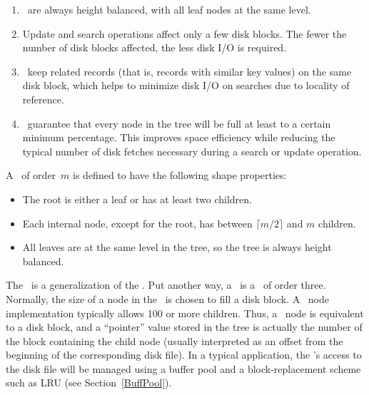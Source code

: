 \begin{enumerate}

\item
\Btrees\ are always height balanced, with all leaf nodes at the same
level.

\item Update and search operations affect only a few disk blocks.
The fewer the number of disk blocks affected, the less disk I/O is
required.

\item
\Btrees\ keep related records (that is, records with similar key
values) on the same disk block, which helps to minimize disk I/O on
searches due to locality of reference.

\item
\Btrees\ guarantee that every node in the tree will be
full at least to a certain minimum percentage.
This improves space efficiency while reducing the typical number of
disk fetches necessary during a search or update operation.

\end{enumerate}

A \Btree\ of order~\(m\) is defined to have
the following shape properties:

\begin{itemize}
\item
The root is either a leaf or has at least two children.
\item
Each internal node, except for the root, has between
\(\lceil m/2 \rceil \) and \(m\) children.
\item
All leaves are at the same level in the tree, so the tree is always
height balanced.
\end{itemize}

The \Btree\ is a generalization of the
\TTtree.
Put another way, a \TTtree\ is a \Btree\ of order three.
Normally, the size of a node in the \Btree\ is chosen to fill a disk
block.
A \Btree\ node implementation typically allows 100 or more children.
Thus, a \Btree\ node is equivalent to a disk block, and a ``pointer''
value stored in the tree is actually the number of the block
containing the child node (usually interpreted as an offset from the
beginning of the corresponding disk file).
In a typical application, the \Btree's access to the disk file will be
managed using a buffer pool and a block-replacement scheme such as
LRU
(see Section~\ref{BuffPool}).

